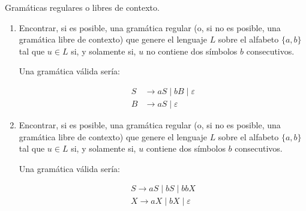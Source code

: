 \documentclass[12pt]{book} %
\begin{document}
\begin{ejercicio}
Gramáticas regulares o libres de contexto.

\begin{enumerate}[label=\alph*)]
    \item Encontrar, si es posible, una gramática regular (o, si no es posible, una gramática libre de contexto) que genere el lenguaje $L$ sobre el alfabeto $\{a, b\}$ tal que $u \in L$ si, y solamente si, $u$ no contiene dos símbolos $b$ consecutivos.

    \begin{solucion}[a)]
    Una gramática válida sería:

    \begin{align*}
        S &\to aS \mid bB \mid \varepsilon \\
        B &\to aS \mid \varepsilon
    \end{align*}
    \end{solucion}

    \item Encontrar, si es posible, una gramática regular (o, si no es posible, una gramática libre de contexto) que genere el lenguaje $L$ sobre el alfabeto $\{a, b\}$ tal que $u \in L$ si, y solamente si, $u$ contiene dos símbolos $b$ consecutivos.

    \begin{solucion}[b)]
    Una gramática válida sería:

    \begin{align*}
        S \rightarrow aS \mid bS \mid bbX \\
        X \rightarrow aX \mid bX \mid \varepsilon
    \end{align*}
    \end{solucion}
\end{enumerate}
\end{ejercicio}
\end{document}
